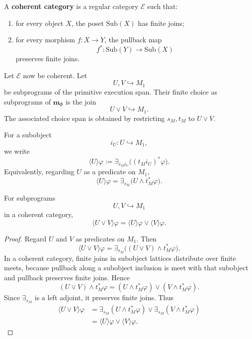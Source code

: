 \begin{definition}
\label{def:coherent-category}
A \textbf{coherent category} is a regular category \(\mathcal E\) such that:
\begin{enumerate}
\item for every object \(X\), the poset \(\mathrm{Sub}(X)\) has finite joins;
\item for every morphism \(f:X\to Y\), the pullback map
\[
f^\ast:\mathrm{Sub}(Y)\to\mathrm{Sub}(X)
\]
preserves finite joins.
\end{enumerate}
\end{definition}

Let \(\mathcal E\) now be coherent. Let
\[
U,V\hookrightarrow M_1
\]
be subprograms of the primitive execution span. Their finite choice as subprograms of \(\mathbf m_\Phi\) is the join
\[
U\vee V\hookrightarrow M_1.
\]
The associated choice span is obtained by restricting \(s_M,t_M\) to \(U\vee V\).

For a subobject
\[
i_U:U\hookrightarrow M_1,
\]
we write
\[
\langle U\rangle\varphi
:=
\exists_{s_M i_U}\bigl((t_M i_U)^\ast\varphi\bigr).
\]
Equivalently, regarding \(U\) as a predicate on \(M_1\),
\[
\langle U\rangle\varphi
=
\exists_{s_M}\bigl(U\wedge t_M^\ast\varphi\bigr).
\]

\begin{proposition}
\label{prop:choice-law-coherent}
For subprograms
\[
U,V\hookrightarrow M_1
\]
in a coherent category,
\[
\langle U\vee V\rangle\varphi
=
\langle U\rangle\varphi
\vee
\langle V\rangle\varphi.
\]
\end{proposition}

\begin{proof}
Regard \(U\) and \(V\) as predicates on \(M_1\). Then
\[
\langle U\vee V\rangle\varphi
=
\exists_{s_M}\bigl((U\vee V)\wedge t_M^\ast\varphi\bigr).
\]
In a coherent category, finite joins in subobject lattices distribute over finite meets, because pullback along a subobject inclusion is meet with that subobject and pullback preserves finite joins. Hence
\[
(U\vee V)\wedge t_M^\ast\varphi
=
(U\wedge t_M^\ast\varphi)
\vee
(V\wedge t_M^\ast\varphi).
\]
Since \(\exists_{s_M}\) is a left adjoint, it preserves finite joins. Thus
\[
\begin{aligned}
\langle U\vee V\rangle\varphi
&=
\exists_{s_M}(U\wedge t_M^\ast\varphi)
\vee
\exists_{s_M}(V\wedge t_M^\ast\varphi)
\\
&=
\langle U\rangle\varphi
\vee
\langle V\rangle\varphi.
\end{aligned}
\]
\end{proof}

